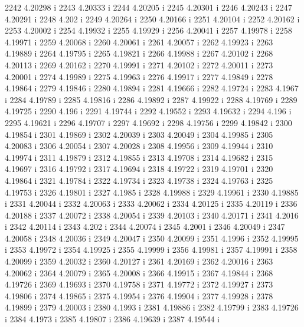  2242  4.20298  i
 2243  4.20333  i
 2244  4.20205  i
 2245  4.20301  i
 2246  4.20243  i
 2247  4.20291  i
 2248  4.202  i
 2249  4.20264  i
 2250  4.20166  i
 2251  4.20104  i
 2252  4.20162  i
 2253  4.20002  i
 2254  4.19932  i
 2255  4.19929  i
 2256  4.20041  i
 2257  4.19978  i
 2258  4.19971  i
 2259  4.20068  i
 2260  4.20061  i
 2261  4.20057  i
 2262  4.19923  i
 2263  4.19889  i
 2264  4.19795  i
 2265  4.19821  i
 2266  4.19988  i
 2267  4.20102  i
 2268  4.20113  i
 2269  4.20162  i
 2270  4.19991  i
 2271  4.20102  i
 2272  4.20011  i
 2273  4.20001  i
 2274  4.19989  i
 2275  4.19963  i
 2276  4.19917  i
 2277  4.19849  i
 2278  4.19864  i
 2279  4.19846  i
 2280  4.19894  i
 2281  4.19666  i
 2282  4.19724  i
 2283  4.1967  i
 2284  4.19789  i
 2285  4.19816  i
 2286  4.19892  i
 2287  4.19922  i
 2288  4.19769  i
 2289  4.19725  i
 2290  4.196  i
 2291  4.19744  i
 2292  4.19552  i
 2293  4.19632  i
 2294  4.196  i
 2295  4.19621  i
 2296  4.19707  i
 2297  4.19692  i
 2298  4.19756  i
 2299  4.19842  i
 2300  4.19854  i
 2301  4.19869  i
 2302  4.20039  i
 2303  4.20049  i
 2304  4.19985  i
 2305  4.20083  i
 2306  4.20054  i
 2307  4.20028  i
 2308  4.19956  i
 2309  4.19944  i
 2310  4.19974  i
 2311  4.19879  i
 2312  4.19855  i
 2313  4.19708  i
 2314  4.19682  i
 2315  4.19697  i
 2316  4.19792  i
 2317  4.19694  i
 2318  4.19722  i
 2319  4.19701  i
 2320  4.19864  i
 2321  4.19784  i
 2322  4.19734  i
 2323  4.19738  i
 2324  4.19763  i
 2325  4.19753  i
 2326  4.19801  i
 2327  4.1985  i
 2328  4.19988  i
 2329  4.19961  i
 2330  4.19885  i
 2331  4.20044  i
 2332  4.20063  i
 2333  4.20062  i
 2334  4.20125  i
 2335  4.20119  i
 2336  4.20188  i
 2337  4.20072  i
 2338  4.20054  i
 2339  4.20103  i
 2340  4.20171  i
 2341  4.2016  i
 2342  4.20114  i
 2343  4.202  i
 2344  4.20074  i
 2345  4.2001  i
 2346  4.20049  i
 2347  4.20058  i
 2348  4.20036  i
 2349  4.20047  i
 2350  4.20099  i
 2351  4.1996  i
 2352  4.19995  i
 2353  4.19972  i
 2354  4.19925  i
 2355  4.19999  i
 2356  4.19981  i
 2357  4.19991  i
 2358  4.20099  i
 2359  4.20032  i
 2360  4.20127  i
 2361  4.20169  i
 2362  4.20016  i
 2363  4.20062  i
 2364  4.20079  i
 2365  4.20008  i
 2366  4.19915  i
 2367  4.19844  i
 2368  4.19726  i
 2369  4.19693  i
 2370  4.19758  i
 2371  4.19772  i
 2372  4.19927  i
 2373  4.19806  i
 2374  4.19865  i
 2375  4.19954  i
 2376  4.19904  i
 2377  4.19928  i
 2378  4.19899  i
 2379  4.20003  i
 2380  4.1993  i
 2381  4.19886  i
 2382  4.19799  i
 2383  4.19726  i
 2384  4.1973  i
 2385  4.19807  i
 2386  4.19639  i
 2387  4.19544  i
